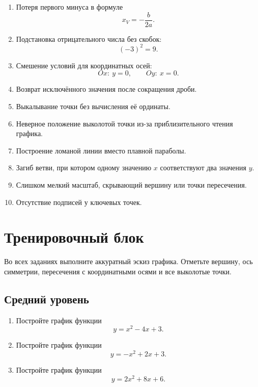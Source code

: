 \documentclass[a4paper,12pt]{article}
\begin{document}
\begin{enumerate}
  \item Потеря первого минуса в формуле
  \[
    x_V=-\frac{b}{2a}.
  \]

  \item Подстановка отрицательного числа без скобок:
  \[
    (-3)^2=9.
  \]

  \item Смешение условий для координатных осей:
  \[
    Ox:\ y=0,
    \qquad
    Oy:\ x=0.
  \]

  \item Возврат исключённого значения после сокращения дроби.

  \item Выкалывание точки без вычисления её ординаты.

  \item Неверное положение выколотой точки из-за приблизительного чтения графика.

  \item Построение ломаной линии вместо плавной параболы.

  \item Загиб ветви, при котором одному значению \(x\) соответствуют два значения \(y\).

  \item Слишком мелкий масштаб, скрывающий вершину или точки пересечения.

  \item Отсутствие подписей у ключевых точек.
\end{enumerate}


\clearpage
\section*{Тренировочный блок}

Во всех заданиях выполните аккуратный эскиз графика. Отметьте вершину, ось симметрии, пересечения с координатными осями и все выколотые точки.

\subsection*{Средний уровень}

\begin{enumerate}[label=\textbf{\arabic*.}]
  \item Постройте график функции
  \[
    y=x^2-4x+3.
  \]

  \item Постройте график функции
  \[
    y=-x^2+2x+3.
  \]

  \item Постройте график функции
  \[
    y=2x^2+8x+6.
  \]
\end{enumerate}
\end{document}
